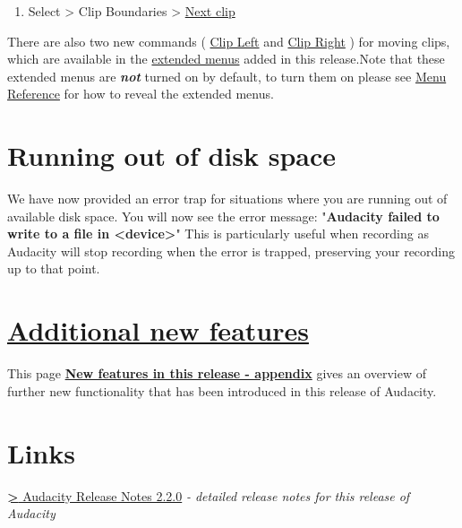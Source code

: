 \begin{multicols}{2}
\begin{enumerate}
\item Select > Clip Boundaries > 
\hyperref[select_menu_clip_boundaries__next_clip]{Next clip}

\end{enumerate}
There are also two new commands (
\hyperref[ext_command_menu_cursor__clip_left]{Clip Left}
 and 
\hyperref[ext_command_menu_cursor__clip_right]{Clip Right}
) for moving clips, which are available in the 
\hyperref[_extendedmenubar]{extended menus}
 added in this release.Note that these extended menus are \textit{\textbf{not}} turned on by default, to turn them on please see 
\hyperref[menu_reference__the_extended_menu_bar]{Menu Reference}
 for how to reveal the extended menus.
\section{Running out of disk space}We have now provided an error trap for situations where you are running out of available disk space.
You will now see the error message:
"\textbf{Audacity failed to write to a file in <device>}"
This is particularly useful when recording as Audacity will stop recording when the error is trapped, preserving your recording up to that point.

\section{
\hyperref[new_features_in_this_release_appendix_]{Additional new features}
}This page \textbf{
\hyperref[new_features_in_this_release_appendix_]{New features in this release - appendix}
} gives an overview of further new functionality that has been introduced in this release of Audacity.

\section{Links}
\hyperref[https:__wiki.audacityteam.org_wiki_Release_Notes_2.2.0]{\textbf{>} Audacity Release Notes 2.2.0}
\textit{- detailed release notes for this release of Audacity}\end{multicols}
